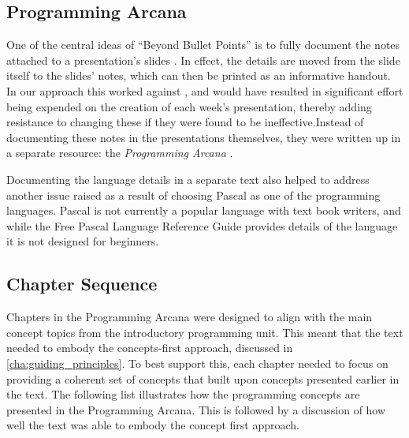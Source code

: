 
\subsection{Programming Arcana} %
\label{sub:programming_arcana}

One of the central ideas of ``Beyond Bullet Points'' is to fully document the notes attached to a presentation's slides \cite{Atkinson:2007}. In effect, the details are moved from the slide itself to the slides' notes, which can then be printed as an informative handout. In our approach this worked against , and would have resulted in significant effort being expended on the creation of each week's presentation, thereby adding resistance to changing these if they were found to be ineffective.Instead of documenting these notes in the presentations themselves, they were written up in a separate resource: the \emph{Programming Arcana} \cite{Cain:2013arcana}.

Documenting the language details in a separate text also helped to address another issue raised as a result of choosing Pascal as one of the programming languages. Pascal is not currently a popular language with text book writers, and while the Free Pascal Language Reference Guide \cite{FPC:2013lang} provides details of the language it is not designed for beginners.


\subsection{Chapter Sequence} %
\label{ssub:chapter_sequence}

Chapters in the Programming Arcana were designed to align with the main concept topics from the introductory programming unit. This meant that the text needed to embody the concepts-first approach,  discussed in \cref{cha:guiding_principles}. To best support this, each chapter needed to focus on providing a coherent set of concepts that built upon concepts presented earlier in the text. The following list illustrates how the programming concepts are presented in the Programming Arcana. This is followed by a discussion of how well the text was able to embody the concept first approach.

